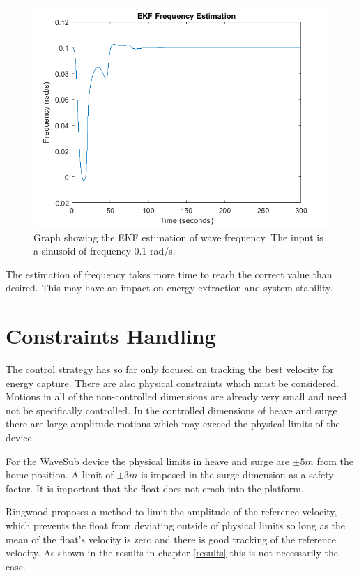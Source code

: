 \documentclass{report}
\begin{document}
\begin{figure}
\centering
\includegraphics[scale=0.5]{graphs/EKFfrequency}
\caption{Graph showing the EKF estimation of wave frequency. The input is a sinusoid of frequency 0.1 rad/s.}
\label{kalmanFrequency}
\end{figure} 

The estimation of frequency takes more time to reach the correct value than desired. This may have an impact on energy extraction and system stability.

\section{Constraints Handling}
\label{constraintsHandlingSection}
The control strategy has so far only focused on tracking the best velocity for energy capture. There are also physical constraints which must be considered. Motions in all of the non-controlled dimensions are already very small and  need not be specifically controlled. In the controlled dimensions of heave and surge there are large amplitude motions which may exceed the physical limits of the device.

For the WaveSub device the physical limits in heave and surge are $\pm 5m$ from the home position. A limit of $\pm 3m$ is imposed in the surge dimension as a safety factor. It is important that the float does not crash into the platform.

Ringwood \cite{ringwood} proposes a method to limit the amplitude of the reference velocity, which prevents the float from deviating outside of physical limits so long as the mean of the float's velocity is zero and there is good tracking of the reference velocity. As shown in the results in chapter \ref{results} this is not necessarily the case.
\end{document}
